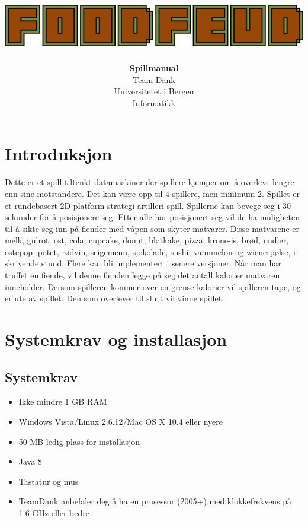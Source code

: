 \documentclass[paper=a4]{article}
\begin{document}
\title{
	\vspace*{10em}
	\includegraphics[width=1.00\textwidth]{images/logo.png}
	\vspace*{3em}
}
\author{\textbf{Spillmanual} \\
Team Dank \\
Universitetet i Bergen \\
Informatikk}
\maketitle
\newpage
\tableofcontents
\newpage

\section{Introduksjon}
Dette er et spill tiltenkt datamaskiner der spillere kjemper om å overleve lengre enn sine motstandere. Det kan være opp til 4 spillere, men minimum 2. 
Spillet er et rundebasert 2D-platform strategi artilleri spill. Spillerne kan bevege seg i 30 sekunder for å posisjonere seg. 
Etter alle har posisjonert seg vil de ha muligheten til å sikte seg inn på fiender med våpen som skyter matvarer. 
Disse matvarene er melk, gulrot, ost, cola, cupcake, donut, bløtkake, pizza, krone-is, brød, nudler, ostepop, potet, rødvin, seigemenn, sjokolade, sushi, vannmelon og wienerpølse, i skrivende stund. Flere kan bli implementert i senere versjoner.
Når man har truffet en fiende, vil denne fienden legge på seg det antall kalorier matvaren inneholder. 
Dersom spilleren kommer over en grense kalorier vil spilleren tape, og er ute av spillet. Den som overlever til slutt vil vinne spillet.


\section{Systemkrav og installasjon}

\subsection{Systemkrav}
\begin{itemize}
	\item{Ikke mindre 1 GB RAM}
	\item{Windows Vista/Linux 2.6.12/Mac OS X 10.4 eller nyere}
	\item{50 MB ledig plass for installasjon}
	\item{Java 8}
	\item{Tastatur og mus}
	\item{TeamDank anbefaler deg å ha en prosessor (2005+) med klokkefrekvens på 1.6 GHz eller bedre}
\end{itemize}
\end{document}
